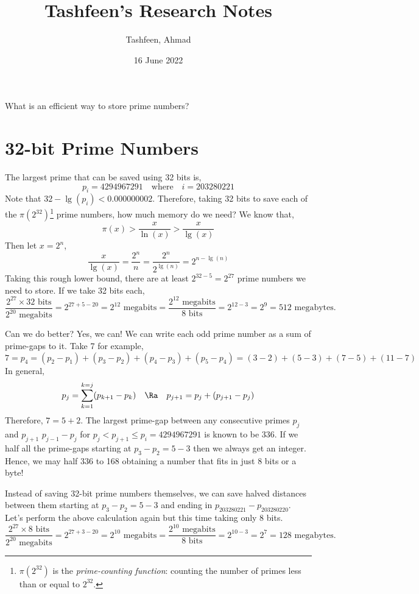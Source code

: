 \documentclass{homework}
\author{Tashfeen, Ahmad}
\date{16 June 2022}
\title{Tashfeen's Research Notes}
\begin{document}
 \maketitle

\question What is an efficient way to store prime numbers?

\section{32-bit Prime Numbers}

The largest prime that can be saved using 32 bits is,
\[
    p_i = 4294967291\quad\text{where}\quad i=203280221
\]
Note that $32-\lg(p_i) < 0.000000002$. Therefore, taking 32 bits to save each of the $\pi(2^{32})$\footnote{$\pi(2^{32})$ is the \textit{prime-counting function}: counting the number of primes less than or equal to $2^{32}$.} prime numbers, how much memory do we need? We know that,
\[
    \pi(x) > \frac{x}{\ln(x)} > \frac{x}{\lg(x)}
\]
Then let $x=2^n$,
\[
    \frac{x}{\lg(x)} = \frac{2^n}{n} = \frac{2^n}{2^{\lg(n)}} = 2^{n-\lg(n)}
\]
Taking this rough lower bound, there are at least $2^{32-5}=2^{27}$ prime numbers we need to store. If we take 32 bits each,
\[
    \frac{2^{27}\times 32\text{ bits}}{2^{20} \text{ megabits}} =
    2^{27+5-20} = 2^{12} \text{ megabits} = \frac{2^{12} \text{ megabits}}{8 \text{ bits}} = 2^{12-3}=2^9 = 512 \text{ megabytes}.
\]

Can we do better? Yes, we can! We can write each odd prime number as a sum of prime-gaps to it. Take 7 for example,
\[
    7 = p_4 = (p_2-p_1) + (p_3-p_2) + (p_4-p_3) + (p_5-p_4)
      = (3-2) + (5-3) + (7 - 5) + (11 - 7)
\]
In general,
\[
    p_j = \sum_{k=1}^{k=j}(p_{k+1}-p_k) \quad \Ra \quad p_{j+1} = p_j + (p_{j+1}-p_j)
\]
Therefore, $7 = 5 + 2$. The largest prime-gap between any consecutive primes $p_j$ and $p_{j+1}$ \ie $p_{j-1}-p_{j}$ for $p_j < p_{j+1} \leq p_i = 4294967291$ is known to be 336. If we half all the prime-gaps starting at $p_3-p_2 = 5-3$ then we always get an integer. Hence, we may half 336 to 168 obtaining a number that fits in just 8 bits or a byte!

Instead of saving 32-bit prime numbers themselves, we can save halved distances between them starting at $p_3-p_2 = 5-3$ and ending in $p_{203280221}-p_{203280220}$. Let's perform the above calculation again but this time taking only 8 bits.
\[
    \frac{2^{27}\times 8\text{ bits}}{2^{20} \text{ megabits}} =
    2^{27+3-20} = 2^{10} \text{ megabits} = \frac{2^{10} \text{ megabits}}{8 \text{ bits}} = 2^{10-3}=2^7 = 128 \text{ megabytes}.
\]
\end{document}
